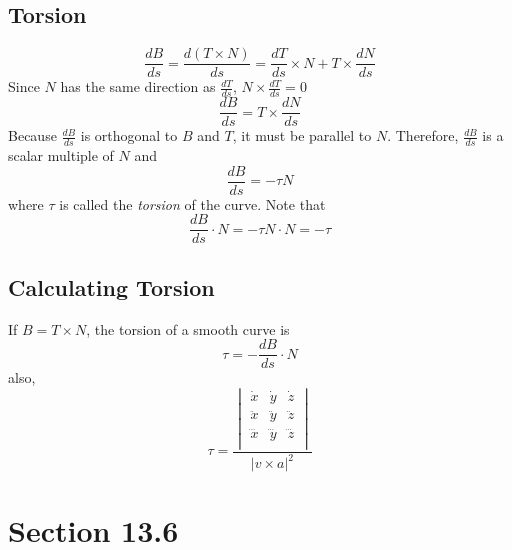 \documentclass[12pt]{article}
\theoremstyle{break}
\numberwithin{theorem}{subsection}
\numberwithin{lemma}{subsection}
\numberwithin{corollary}{subsection}
\numberwithin{equation}{subsection}
\begin{document}
\subsection{Torsion}
\begin{equation*}
\frac{dB}{ds} = \frac{d(T \times N)}{ds} = \frac{dT}{ds} \times N + T \times \frac{dN}{ds}
\end{equation*}
Since $N$ has the same direction as $\frac{dT}{ds}$, $N \times \frac{dT}{ds} = 0$
\begin{equation*}
\frac{dB}{ds} = T \times \frac{dN}{ds}
\end{equation*}
Because $\frac{dB}{ds}$ is orthogonal to $B$ and $T$, it must be parallel to $N$. Therefore, 
$\frac{dB}{ds}$ is a scalar multiple of $N$ and 
\begin{equation*}
\frac{dB}{ds} = -\tau N
\end{equation*}
where $\tau$ is called the \textit{torsion} of the curve. Note that 
\begin{equation*}
\frac{dB}{ds} \cdot N = -\tau N \cdot N = -\tau
\end{equation*}

\subsection{Calculating Torsion}
If $B = T \times N$, the torsion of a smooth curve is 
\begin{equation*}
\tau = - \frac{dB}{ds} \cdot N
\end{equation*}
also, 
\begin{equation*}
\tau = \frac{
	\begin{vmatrix}
	\dot x & \dot y & \dot z \\
	\ddot x & \ddot y & \ddot z \\
	\dddot x & \dddot y & \dddot z \\
	\end{vmatrix}
}{| v \times a |^2}
\end{equation*}

\section{Section 13.6}
\end{document}

